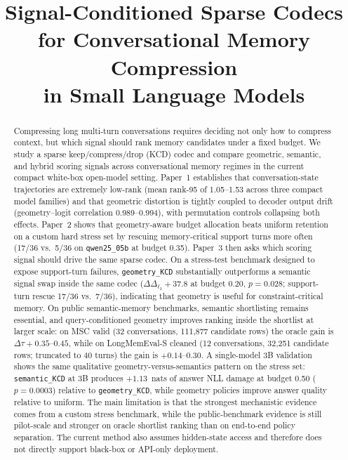 \documentclass[conference]{IEEEtran}
\title{Signal-Conditioned Sparse Codecs for Conversational Memory Compression\\
in Small Language Models}
\author{
\IEEEauthorblockN{Pranav Kompally}
\IEEEauthorblockA{
Independent Researcher\\
New York, USA
}
}
\newcommand{\Logit}{\Delta_{\ell_2}}
\begin{document}
\maketitle

\begin{abstract}
Compressing long multi-turn conversations requires deciding not only how to
compress context, but which signal should rank memory candidates under a
fixed budget. We study a sparse keep/compress/drop (KCD) codec and compare
geometric, semantic, and hybrid scoring signals across conversational memory
regimes in the current compact white-box open-model setting. Paper~1
establishes that conversation-state trajectories are extremely low-rank
(mean rank-95 of 1.05--1.53 across three compact model families) and that
geometric distortion is tightly coupled to decoder output drift
(geometry--logit correlation 0.989--0.994), with permutation controls
collapsing both effects. Paper~2 shows that geometry-aware budget allocation
beats uniform retention on a custom hard stress set by rescuing
memory-critical support turns more often (17/36 vs.\ 5/36 on
\texttt{qwen25\_05b} at budget 0.35). Paper~3 then asks which scoring signal
should drive the same sparse codec. On a stress-test benchmark designed to
expose support-turn failures, \texttt{geometry\_KCD} substantially outperforms
a semantic signal swap inside the same codec ($\Delta\Logit{+}37.8$ at budget
0.20, $p{=}0.028$; support-turn rescue 17/36 vs.\ 7/36), indicating that
geometry is useful for constraint-critical memory. On public semantic-memory
benchmarks, semantic shortlisting remains essential, and query-conditioned
geometry improves ranking inside the shortlist at larger scale: on MSC valid
(32 conversations, 111{,}877 candidate rows) the oracle gain is
$\Delta\tau {+}0.35$--$0.45$, while on LongMemEval-S cleaned
(12 conversations, 32{,}251 candidate rows; truncated to 40 turns) the gain
is $+0.14$--$0.30$. A single-model 3B validation shows the same qualitative
geometry-versus-semantics pattern on the stress set: \texttt{semantic\_KCD}
at 3B produces $+1.13$~nats of answer NLL damage at budget 0.50
($p{=}0.0003$) relative to \texttt{geometry\_KCD}, while geometry policies
improve answer quality relative to uniform. The main limitation is that the
strongest mechanistic evidence comes from a custom stress benchmark, while
the public-benchmark evidence is still pilot-scale and stronger on oracle
shortlist ranking than on end-to-end policy separation. The current method
also assumes hidden-state access and therefore does not directly support
black-box or API-only deployment.
\end{abstract}
\end{document}
